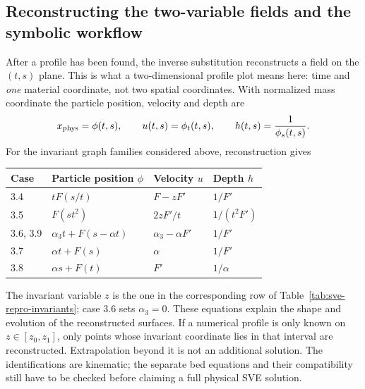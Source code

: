 \subsection{Reconstructing the two-variable fields and the symbolic workflow}
After a profile has been found, the inverse substitution reconstructs a
field on the $(t,s)$ plane. This is what a two-dimensional profile plot
means here: time and \emph{one} material coordinate, not two spatial
coordinates. With normalized mass coordinate the particle position,
velocity and depth are
\[
 x_{\rm phys}=\phi(t,s),\qquad u(t,s)=\phi_t(t,s),\qquad
 h(t,s)=\frac1{\phi_s(t,s)}.
\]
For the invariant graph families considered above, reconstruction gives
\begin{center}\small
\begin{tabular}{@{}llll@{}}
\toprule
Case & Particle position $\phi$ & Velocity $u$ & Depth $h$\\
\midrule
3.4 & $tF(s/t)$ & $F-zF'$ & $1/F'$\\
3.5 & $F(st^2)$ & $2zF'/t$ & $1/(t^2F')$\\
3.6, 3.9 & $\alpha_3t+F(s-\alpha t)$ & $\alpha_3-\alpha F'$ & $1/F'$\\
3.7 & $\alpha t+F(s)$ & $\alpha$ & $1/F'$\\
3.8 & $\alpha s+F(t)$ & $F'$ & $1/\alpha$\\
\bottomrule
\end{tabular}
\end{center}
The invariant variable $z$ is the one in the corresponding row of
Table~\ref{tab:sve-repro-invariants}; case 3.6 sets $\alpha_3=0$.
These equations explain the shape and evolution of the reconstructed
surfaces. If a numerical profile is only known on $z\in[z_0,z_1]$,
only points whose invariant coordinate lies in that interval are
reconstructed. Extrapolation beyond it is not an additional solution.
The identifications are kinematic; the separate bed equations and their
compatibility still have to be checked before claiming a full physical SVE
solution.

